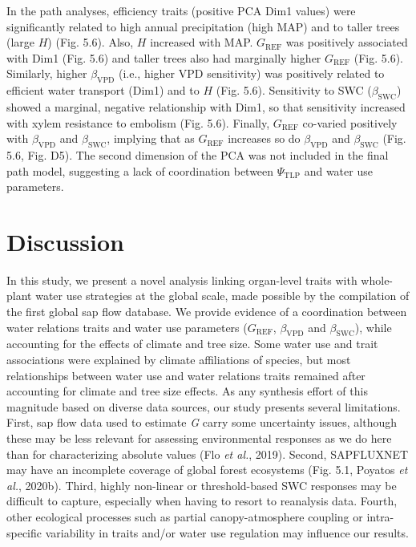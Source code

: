 \documentclass[11pt,twoside]{reedthesis}
\begin{document}
In the path analyses, efficiency traits (positive PCA Dim1 values) were
significantly related to high annual precipitation (high MAP) and to
taller trees (large \(H\)) (Fig. 5.6). Also, \(H\) increased with MAP.
\(G_{\text{REF}}\) was positively associated with Dim1 (Fig. 5.6) and
taller trees also had marginally higher \(G_{\text{REF}}\) (Fig. 5.6).
Similarly, higher \(\beta_{\text{VPD}}\) (i.e., higher VPD sensitivity)
was positively related to efficient water transport (Dim1) and to \(H\)
(Fig. 5.6). Sensitivity to SWC (\(\beta_{\text{SWC}}\)) showed a
marginal, negative relationship with Dim1, so that sensitivity increased
with xylem resistance to embolism (Fig. 5.6). Finally,
\(G_{\text{REF}}\) co-varied positively with \(\beta_{\text{VPD}}\) and
\(\beta_{\text{SWC}}\), implying that as \(G_{\text{REF}}\) increases so
do \(\beta_{\text{VPD}}\) and \(\beta_{\text{SWC}}\) (Fig. 5.6, Fig.
D5). The second dimension of the PCA was not included in the final path
model, suggesting a lack of coordination between \(\Psi_{\text{TLP}}\)
and water use parameters.\par

\section{Discussion}\label{discussion}

In this study, we present a novel analysis linking organ-level traits
with whole-plant water use strategies at the global scale, made possible
by the compilation of the first global sap flow database. We provide
evidence of a coordination between water relations traits and water use
parameters (\(G_{\text{REF}}\), \(\beta_{\text{VPD}}\) and
\(\beta_{\text{SWC}}\)), while accounting for the effects of climate and
tree size. Some water use and trait associations were explained by
climate affiliations of species, but most relationships between water
use and water relations traits remained after accounting for climate and
tree size effects. As any synthesis effort of this magnitude based on
diverse data sources, our study presents several limitations. First, sap
flow data used to estimate \emph{G} carry some uncertainty issues,
although these may be less relevant for assessing environmental
responses as we do here than for characterizing absolute values (Flo
\emph{et al.}, 2019). Second, SAPFLUXNET may have an incomplete coverage
of global forest ecosystems (Fig. 5.1, Poyatos \emph{et al.}, 2020b).
Third, highly non-linear or threshold-based SWC responses may be
difficult to capture, especially when having to resort to reanalysis
data. Fourth, other ecological processes such as partial
canopy-atmosphere coupling or intra-specific variability in traits
and/or water use regulation may influence our results.\par
\end{document}
